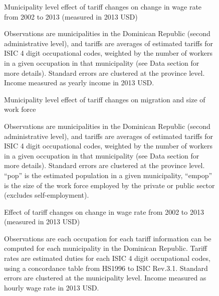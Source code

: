 \documentclass[12pt]{article}
\begin{document}
\begin{figure}[H]
\begin{center}
Municipality level effect of tariff changes on change in wage rate from 2002 to 2013 (measured
in 2013 USD)

\caption{\label{fig:Table1}}
\end{center}
Observations are municipalities in the Dominican Republic (second administrative level),
and tariffs are averages of estimated tariffs for ISIC 4 %
digit occupational codes,
weighted by the number of workers in a given occupation in that municipality 
(see Data section for more details). Standard errors are clustered at the province level.
Income measured as yearly income in 2013 USD.
\end{figure}

\begin{figure}[H]
\begin{center}
Municipality level effect of tariff changes on migration and size of work force

\caption{\label{fig:Table3}}
\end{center}
Observations are municipalities in the Dominican Republic (second administrative level),
and tariffs are averages of estimated tariffs for ISIC 4 %
digit occupational codes,
weighted by the number of workers in a given occupation in that municipality 
(see Data section for more details). Standard errors are clustered at the province level.
``pop'' is the estimated population in a given municipality, ``empop'' is the size of
the work force employed by the private or public sector (excludes self-employment).
\end{figure}

\begin{figure}[H]
Effect of tariff changes on change in wage rate from 2002 to 2013 (measured in 2013 USD)
\begin{center}

\caption{\label{fig:Table2}}
\end{center}
Observations are each occupation for each tariff information can be computed for each municipality 
in the Dominican Republic. Tariff rates are estimated duties for each ISIC 4 %
digit occupational codes,
using a concordance table from HS1996 to ISIC Rev.3.1. Standard errors are clustered at the 
municipality level. Income measured as hourly wage rate in 2013 USD.
\end{figure}
\end{document}
